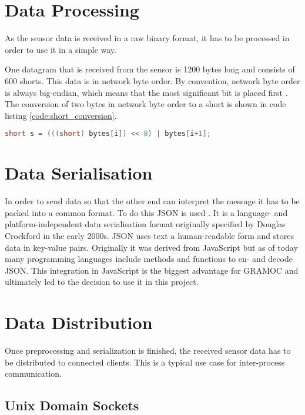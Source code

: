 \section{Data Processing}

As the sensor data is received in a raw binary format, it has to be processed in order to use it in a simple way.

One datagram that is received from the sensor is 1200 bytes long and consists of 600 shorts. This data is in network byte order. By convention, network byte order is always big-endian, which means that the most significant bit is placed first \autocite{IBMByteOrder}. The conversion of two bytes in network byte order to a short is shown in code listing \vref{code:short_conversion}.

\begin{minipage}{\textwidth}
\begin{lstlisting}[caption={Conversion of two bytes to a short}, label={code:short_conversion}, captionpos=b, language=C++]
short s = (((short) bytes[i]) << 8) | bytes[i+1];
\end{lstlisting}
\end{minipage}

\section{Data Serialisation}

In order to send data so that the other end can interpret the message it has to be packed into a common format. To do this JSON is used \autocite{rfc8259}. It is a language- and platform-independent data serialisation format
originally specified by Douglas Crockford in the early 2000s. JSON uses text a human-readable form  and stores data in key-value pairs. Originally it was derived from JavaScript but as of today many programming languages
include methods and functions to en- and decode JSON. This integration in JavaScript is the biggest advantage for GRAMOC and ultimately led to the decision to use it in this project.

\section{Data Distribution}

Once preprocessing and serialization is finished, the received sensor data has to be distributed to connected clients. This is a typical use case for inter-process communication.

\subsection{Unix Domain Sockets}

